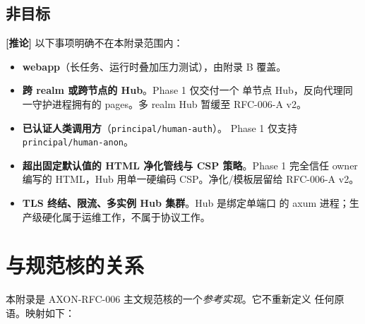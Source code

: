 \documentclass[11pt,a4paper]{article}
\newcommand{\derived}{\textcolor{derivedcolor}{\textbf{[推论]}}\xspace}
\theoremstyle{definition}
\begin{document}
\subsection{非目标}

\derived{} 以下事项明确不在本附录范围内：

\begin{itemize}[leftmargin=2.2em,itemsep=0.2em]
    \item \textbf{webapp}（长任务、运行时叠加压力测试），由附录 B 覆盖。
    \item \textbf{跨 realm 或跨节点的 Hub}。Phase 1 仅交付一个
    单节点 Hub，反向代理同一守护进程拥有的 pages。多 realm Hub
    暂缓至 RFC-006-A v2。
    \item \textbf{已认证人类调用方}（\texttt{principal/human-auth}）。
    Phase 1 仅支持 \texttt{principal/human-anon}。
    \item \textbf{超出固定默认值的 HTML 净化管线与 CSP 策略}。Phase 1
    完全信任 owner 编写的 HTML，Hub 用单一硬编码 CSP。净化/模板层留给
    RFC-006-A v2。
    \item \textbf{TLS 终结、限流、多实例 Hub 集群}。Hub 是绑定单端口
    的 axum 进程；生产级硬化属于运维工作，不属于协议工作。
\end{itemize}

\section{与规范核的关系}
\label{sec:relation}

本附录是 AXON-RFC-006 主文规范核的一个\emph{参考实现}。它不重新定义
任何原语。映射如下：
\end{document}
